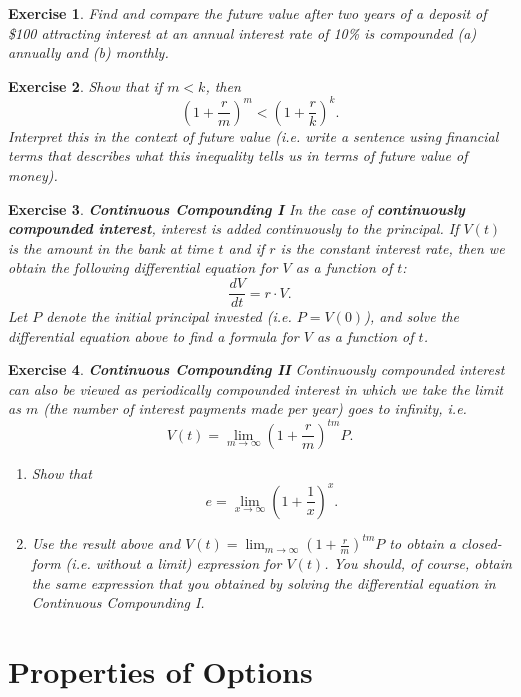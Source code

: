 \documentclass[letterpaper,10pt]{article}
\newtheorem{ex}{Exercise}
\begin{document}
\begin{ex}
Find and compare the future value after two years of a deposit of \$100 attracting interest at an annual interest rate of 10\% is compounded (a) annually and (b) monthly. 
\end{ex}

\begin{ex}
Show that if $m<k$, then $$\left(1+\frac{r}{m}\right)^m<\left(1+\frac{r}{k}\right)^k.$$  Interpret this in the context of future value (i.e. write a sentence using financial terms that describes what this inequality tells us in terms of future value of money).  
\end{ex}


\begin{ex}{\bf Continuous Compounding I}
In the case of {\bf continuously compounded interest}, interest is added {\em continuously} to the principal.  If $V(t)$ is the amount in the bank at time $t$ and if $r$ is the constant interest rate, then we obtain the following differential equation for $V$ as a function of $t$:  $$\frac{dV}{dt}=r\cdot V.$$  Let $P$ denote the initial principal invested (i.e. $P=V(0)$), and solve the differential equation above to find a formula for $V$ as a function of $t$.
\end{ex}

\begin{ex}{\bf Continuous Compounding II}
Continuously compounded interest can also be viewed as periodically compounded interest in which we take the {\em limit} as $m$ (the number of interest payments made per year) goes to infinity, i.e. $$V(t)=\lim_{m\rightarrow\infty}\left(1+\frac{r}{m}\right)^{tm}P.$$
\begin{enumerate}
\item[(a)] Show that $$e=\lim_{x\rightarrow\infty}\left(1+\frac{1}{x}\right)^x.$$  

\item[(b)] Use the result above and $V(t)=\displaystyle \lim_{m\rightarrow\infty}\left(1+\frac{r}{m}\right)^{tm}P$ to obtain a closed-form (i.e. without a limit) expression for $V(t)$.  You should, of course, obtain the same expression that you obtained by solving the differential equation in Continuous Compounding I.
\end{enumerate}
\end{ex}


\newpage

\section{Properties of Options}
\end{document}
